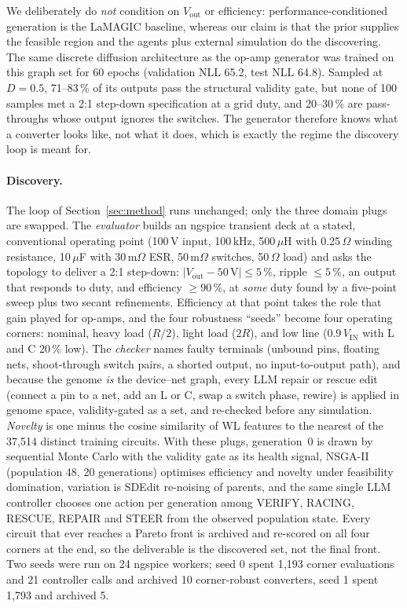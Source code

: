 We deliberately do \emph{not} condition on $V_\mathrm{out}$ or efficiency:
performance-conditioned generation is the LaMAGIC baseline, whereas our claim
is that the prior supplies the feasible region and the agents plus external
simulation do the discovering. The same discrete diffusion architecture as
the op-amp generator was trained on this graph set for 60 epochs (validation
NLL 65.2, test NLL 64.8). Sampled at $D=0.5$, 71--83\,\% of its outputs pass
the structural validity gate, but none of 100 samples met a 2:1 step-down
specification at a grid duty, and 20--30\,\% are pass-throughs whose output
ignores the switches. The generator therefore knows what a converter looks
like, not what it does, which is exactly the regime the discovery loop is
meant for.

\paragraph{Discovery.}
The loop of Section~\ref{sec:method} runs unchanged; only the three domain
plugs are swapped. The \emph{evaluator} builds an ngspice transient deck at a
stated, conventional operating point (100\,V input, 100\,kHz, 500\,$\mu$H with
0.25\,$\Omega$ winding resistance, 10\,$\mu$F with 30\,m$\Omega$ ESR, 50\,m$\Omega$
switches, 50\,$\Omega$ load) and asks the topology to deliver a 2:1
step-down: $|V_\mathrm{out}-50\,\mathrm{V}|\le 5\,\%$, ripple $\le 5\,\%$, an output
that responds to duty, and efficiency $\ge 90\,\%$, at \emph{some} duty found
by a five-point sweep plus two secant refinements. Efficiency at that point
takes the role that gain played for op-amps, and the four robustness
``seeds'' become four operating corners: nominal, heavy load ($R/2$), light
load ($2R$), and low line ($0.9\,V_\mathrm{IN}$ with L and C 20\,\% low).
The \emph{checker} names faulty terminals (unbound pins, floating nets,
shoot-through switch pairs, a shorted output, no input-to-output path), and
because the genome \emph{is} the device--net graph, every LLM repair or
rescue edit (connect a pin to a net, add an L or C, swap a switch phase,
rewire) is applied in genome space, validity-gated as a set, and re-checked
before any simulation. \emph{Novelty} is one minus the cosine similarity of
WL features to the nearest of the 37{,}514 distinct training circuits. With
these plugs, generation~0 is drawn by sequential Monte Carlo with the
validity gate as its health signal, NSGA-II (population 48, 20 generations)
optimises efficiency and novelty under feasibility domination, variation is
SDEdit re-noising of parents, and the same single LLM controller chooses one
action per generation among VERIFY, RACING, RESCUE, REPAIR and STEER from the
observed population state. Every circuit that ever reaches a Pareto front is
archived and re-scored on all four corners at the end, so the deliverable is
the discovered set, not the final front. Two seeds were run on 24 ngspice
workers; seed 0 spent 1{,}193 corner evaluations and 21 controller calls and
archived 10 corner-robust converters, seed 1 spent 1{,}793 and archived 5.

